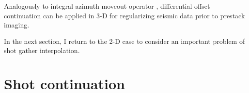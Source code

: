 
  


Analogously to integral azimuth moveout operator
\cite{GEO63-02-05740588}, differential offset continuation can be
applied in 3-D for regularizing seismic data prior to prestack imaging.

  
  In the next section, I return to the 2-D case to consider an
  important problem of shot gather interpolation.

  \section{Shot continuation}
  
